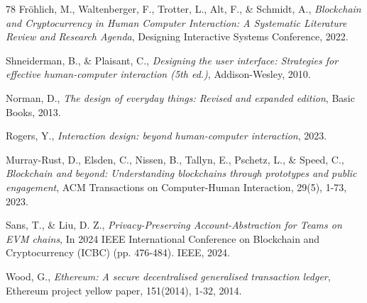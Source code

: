 \documentclass[preprint,12pt]{elsarticle}
\begin{document}
\begin{thebibliography}{78}
Fröhlich, M., Waltenberger, F., Trotter, L., Alt, F., \& Schmidt, A.,
\textit{Blockchain and Cryptocurrency in Human Computer Interaction: A Systematic Literature Review and Research Agenda},
Designing Interactive Systems Conference,
2022.

Shneiderman, B., \& Plaisant, C.,
\textit{Designing the user interface: Strategies for effective human-computer interaction (5th ed.)},
Addison-Wesley,
2010.

Norman, D.,
\textit{The design of everyday things: Revised and expanded edition},
Basic Books,
2013.

Rogers, Y.,
\textit{Interaction design: beyond human-computer interaction},
2023.

Murray-Rust, D., Elsden, C., Nissen, B., Tallyn, E., Pschetz, L., \& Speed, C.,
\textit{Blockchain and beyond: Understanding blockchains through prototypes and public engagement},
ACM Transactions on Computer-Human Interaction, 29(5), 1-73,
2023.

Sans, T., \& Liu, D. Z.,
\textit{Privacy-Preserving Account-Abstraction for Teams on EVM chains},
In 2024 IEEE International Conference on Blockchain and Cryptocurrency (ICBC) (pp. 476-484). IEEE,
2024.

Wood, G.,
\textit{Ethereum: A secure decentralised generalised transaction ledger},
Ethereum project yellow paper, 151(2014), 1-32,
2014.


\end{thebibliography}
\end{document}
